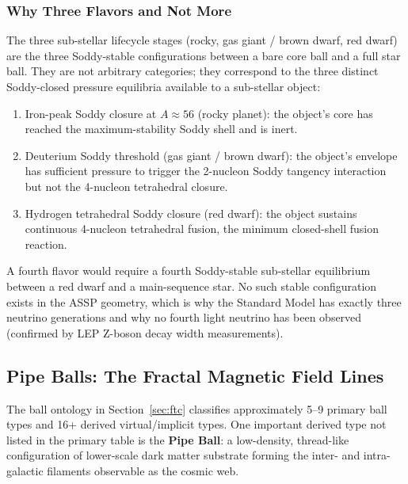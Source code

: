   \subsubsection{Why Three Flavors and Not More}

    The three sub-stellar lifecycle stages (rocky, gas giant / brown dwarf, red dwarf)
    are the three Soddy-stable configurations between a bare core ball and a
    full star ball. They are not arbitrary categories; they correspond to the three
    distinct Soddy-closed pressure equilibria available to a sub-stellar object:
    \begin{enumerate}
      \item Iron-peak Soddy closure at $A \approx 56$ (rocky planet): the object's
            core has reached the maximum-stability Soddy shell and is inert.
      \item Deuterium Soddy threshold (gas giant / brown dwarf): the object's
            envelope has sufficient pressure to trigger the 2-nucleon Soddy
            tangency interaction but not the 4-nucleon tetrahedral closure.
      \item Hydrogen tetrahedral Soddy closure (red dwarf): the object sustains
            continuous 4-nucleon tetrahedral fusion, the minimum closed-shell
            fusion reaction.
    \end{enumerate}
    A fourth flavor would require a fourth Soddy-stable sub-stellar equilibrium
    between a red dwarf and a main-sequence star. No such stable configuration
    exists in the ASSP geometry, which is why the Standard Model has exactly three
    neutrino generations and why no fourth light neutrino has been observed
    (confirmed by LEP Z-boson decay width measurements).



\subsection{Pipe Balls: The Fractal Magnetic Field Lines}

  The ball ontology in Section~\ref{sec:ftc} classifies approximately 5--9 primary
  ball types and 16+ derived virtual/implicit types. One important derived type not
  listed in the primary table is the \textbf{Pipe Ball}: a low-density, thread-like
  configuration of lower-scale dark matter substrate forming the inter- and
  intra-galactic filaments observable as the cosmic web.

